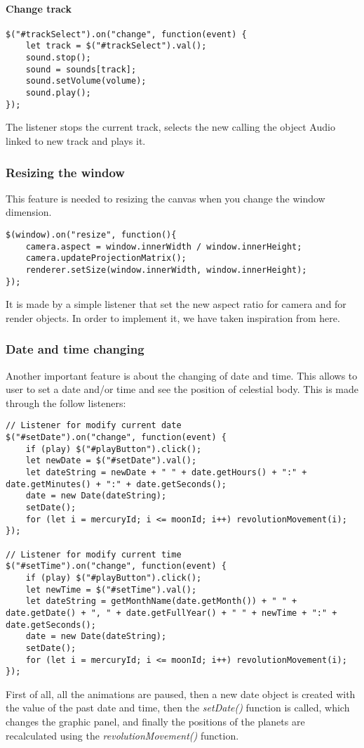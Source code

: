 \documentclass{article}
\begin{document}
\paragraph{Change track} \mbox{}
\begin{lstlisting}
$("#trackSelect").on("change", function(event) {
	let track = $("#trackSelect").val();
	sound.stop();
	sound = sounds[track];
	sound.setVolume(volume);
	sound.play();
});
\end{lstlisting}
The listener stops the current track, selects the new calling the object Audio linked to new track and plays it. 

\subsubsection{Resizing the window}
This feature is needed to resizing the canvas when you change the window dimension. 
\begin{lstlisting}
$(window).on("resize", function(){
	camera.aspect = window.innerWidth / window.innerHeight;
	camera.updateProjectionMatrix();
	renderer.setSize(window.innerWidth, window.innerHeight);
});
\end{lstlisting}
It is made by a simple listener that set the new aspect ratio for camera and for render objects. In order to implement it, we have taken inspiration from here\cite{resizing:stackoverflow}.

\subsubsection{Date and time changing} 
Another important feature is about the changing of date and time. This allows to user to set a date and/or time and see the position of celestial body. This is made through the follow listeners:
\begin{lstlisting}
// Listener for modify current date
$("#setDate").on("change", function(event) {
	if (play) $("#playButton").click();
	let newDate = $("#setDate").val();
	let dateString = newDate + " " + date.getHours() + ":" + date.getMinutes() + ":" + date.getSeconds();
	date = new Date(dateString);
	setDate();
	for (let i = mercuryId; i <= moonId; i++) revolutionMovement(i);
});

// Listener for modify current time
$("#setTime").on("change", function(event) {
	if (play) $("#playButton").click();
	let newTime = $("#setTime").val();
	let dateString = getMonthName(date.getMonth()) + " " + date.getDate() + ", " + date.getFullYear() + " " + newTime + ":" + date.getSeconds();
	date = new Date(dateString);
	setDate();
	for (let i = mercuryId; i <= moonId; i++) revolutionMovement(i);
});
\end{lstlisting}
First of all, all the animations are paused, then a new date object is created with the value of the past date and time, then the \textit{setDate()} function is called, which changes the graphic panel, and finally the positions of the planets are recalculated using the \textit{revolutionMovement()} function.
\end{document}
